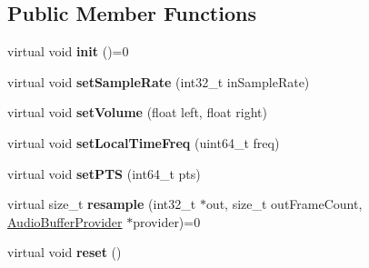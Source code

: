 \subsection*{Public Member Functions}
\begin{DoxyCompactItemize}
\item 
\mbox{\label{classcocos2d_1_1experimental_1_1AudioResampler_ab6e34a6d25d51219781fcbcbd6e89c91}} 
virtual void {\bfseries init} ()=0
\item 
\mbox{\label{classcocos2d_1_1experimental_1_1AudioResampler_a7b7aa9bb6f0da8a052cb0457255c331e}} 
virtual void {\bfseries set\+Sample\+Rate} (int32\+\_\+t in\+Sample\+Rate)
\item 
\mbox{\label{classcocos2d_1_1experimental_1_1AudioResampler_a3272aa7798c7aa22a524ed22a99b7e2c}} 
virtual void {\bfseries set\+Volume} (float left, float right)
\item 
\mbox{\label{classcocos2d_1_1experimental_1_1AudioResampler_af3266ab0274a3873ecf59b517a89b864}} 
virtual void {\bfseries set\+Local\+Time\+Freq} (uint64\+\_\+t freq)
\item 
\mbox{\label{classcocos2d_1_1experimental_1_1AudioResampler_aa36e071b791d39c432a9611749a10713}} 
virtual void {\bfseries set\+P\+TS} (int64\+\_\+t pts)
\item 
\mbox{\label{classcocos2d_1_1experimental_1_1AudioResampler_a045a9dd73f86c9d1b766b63ab2de3c14}} 
virtual size\+\_\+t {\bfseries resample} (int32\+\_\+t $\ast$out, size\+\_\+t out\+Frame\+Count, \hyperlink{classcocos2d_1_1experimental_1_1AudioBufferProvider}{Audio\+Buffer\+Provider} $\ast$provider)=0
\item 
\mbox{\label{classcocos2d_1_1experimental_1_1AudioResampler_aa92189782aee2e90d030d4b53edecd89}} 
virtual void {\bfseries reset} ()
\item 
\mbox{\label{classcocos2d_1_1experimental_1_1AudioResampler_a3ef3b1d29fe9bf3df48514af9166c4d6}} 

\end{DoxyCompactItemize}
